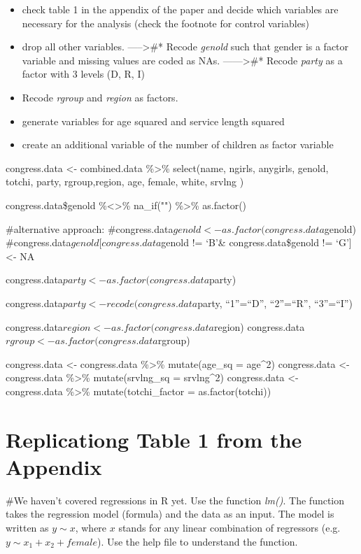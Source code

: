 \documentclass[
]{article}
\providecommand{\tightlist}{%
  \setlength{\itemsep}{0pt}\setlength{\parskip}{0pt}}
\begin{document}
\begin{itemize}
\tightlist
\item
  check table 1 in the appendix of the paper and decide which variables
  are necessary for the analysis (check the footnote for control
  variables)
\item
  drop all other variables. -----\textgreater\#* Recode \emph{genold}
  such that gender is a factor variable and missing values are coded as
  NAs. ------\textgreater\#* Recode \emph{party} as a factor with 3
  levels (D, R, I)
\item
  Recode \emph{rgroup} and \emph{region} as factors.
\item
  generate variables for age squared and service length squared
\item
  create an additional variable of the number of children as factor
  variable
\end{itemize}

congress.data \textless- combined.data \%\textgreater\% select(name,
ngirls, anygirls, genold, totchi, party, rgroup,region, age, female,
white, srvlng )

congress.data\$genold \%\textless\textgreater\% na\_if("")
\%\textgreater\% as.factor()

\#alternative approach:
\#congress.data\(genold <- as.factor(congress.data\)genold)
\#congress.data\(genold[congress.data\)genold != `B'\&
congress.data\$genold != `G'{]} \textless- NA

congress.data\(party <- as.factor(congress.data\)party)

congress.data\(party <- recode(congress.data\)party, ``1''=``D'',
``2''=``R'', ``3''=``I'')

congress.data\(region <- as.factor(congress.data\)region)
congress.data\(rgroup <- as.factor(congress.data\)rgroup)

congress.data \textless- congress.data \%\textgreater\% mutate(age\_sq =
age\^{}2) congress.data \textless- congress.data \%\textgreater\%
mutate(srvlng\_sq = srvlng\^{}2) congress.data \textless- congress.data
\%\textgreater\% mutate(totchi\_factor = as.factor(totchi))

\hypertarget{replicationg-table-1-from-the-appendix}{%
\section{Replicationg Table 1 from the
Appendix}\label{replicationg-table-1-from-the-appendix}}

\#We haven't covered regressions in R yet. Use the function \emph{lm()}.
The function takes the regression model (formula) and the data as an
input. The model is written as \(y \sim x\), where \(x\) stands for any
linear combination of regressors (e.g.~\(y \sim x_1 + x_2 + female\)).
Use the help file to understand the function.
\end{document}
